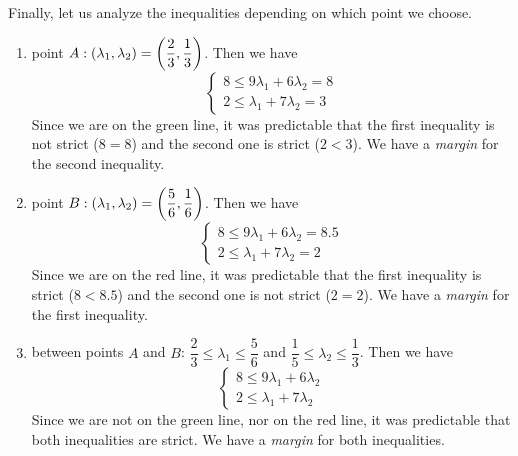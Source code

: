 Finally, let us analyze the inequalities depending on which point we choose. 
\begin{enumerate}
    \item point $A: \left( \lambda_{1},\lambda_{2} \right) = \left( \dfrac{2}{3},\dfrac{1}{3} \right)$.
    Then we have
    \begin{equation*}
    \begin{cases}
    8 \leq 9 \lambda_{1} + 6 \lambda_{2} = 8  \\
    2 \leq \lambda_{1} + 7 \lambda_{2} = 3
    \end{cases}
    \end{equation*}
    Since we are on the green line, it was predictable that the first inequality is not strict ($8 = 8$) and the second one is strict ($2 < 3$). We have a \textit{margin} for the second inequality.
    
    \item point $B: \left( \lambda_{1},\lambda_{2} \right) = \left( \dfrac{5}{6},\dfrac{1}{6} \right)$.
    Then we have
    \begin{equation*}
    \begin{cases}
    8 \leq 9 \lambda_{1} + 6 \lambda_{2} = 8.5  \\
    2 \leq \lambda_{1} + 7 \lambda_{2} = 2
    \end{cases}
    \end{equation*}
    Since we are on the red line, it was predictable that the first inequality is strict ($8 < 8.5$) and the second one is not strict ($2 = 2$). We have a \textit{margin} for the first inequality.
    
    \item between points $A$ and $B$: $\dfrac{2}{3} \leq \lambda_{1} \leq \dfrac{5}{6}$ and $\dfrac{1}{5} \leq \lambda_{2} \leq \dfrac{1}{3}$.
    Then we have
    \begin{equation*}
    \begin{cases}
    8 \leq 9 \lambda_{1} + 6 \lambda_{2}  \\
    2 \leq \lambda_{1} + 7 \lambda_{2}
    \end{cases}
    \end{equation*}
    Since we are not on the green line, nor on the red line, it was predictable that both inequalities are strict. We have a \textit{margin} for both inequalities.
    
    
\end{enumerate}
    
    
    
    
    




        
